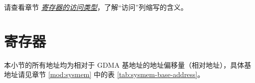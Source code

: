 \documentclass[main\_\_CN.tex]{subfiles}
\begin{document}
请查看章节 \hyperref[glossary-access-types]{\textit{寄存器的访问类型}}，了解“访问”列缩写的含义。






\clearpage
\section{寄存器}

本小节的所有地址均为相对于 GDMA 基地址的地址偏移量（相对地址），具体基地址请见章节 \ref{mod:sysmem} \textit{} 中的表 \ref{tab:sysmem-base-address}。


\end{document}
